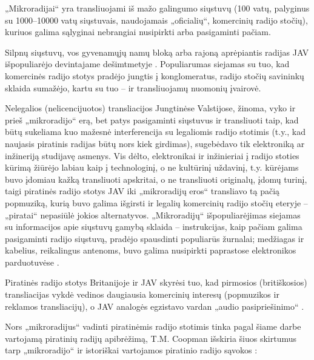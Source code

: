 \documentclass[kursinis-darbas]{vukf}
\begin{document}
„Mikroradijai“ yra transliuojami iš mažo galingumo siųstuvų (100 vatų, palyginus su 1000--10000 vatų siųstuvais, naudojamais „oficialių“, komercinių radijo stočių), kuriuos galima sąlyginai nebrangiai nusipirkti arba pasigaminti pačiam.

Silpnų siųstuvų, vos gyvenamųjų namų bloką arba rajoną aprėpiantis radijas JAV išpopuliarėjo devintajame dešimtmetyje \cite[p.~2]{tmc_fcc_enforcement_difficulties_with_unlicensed_micro_radio}. Populiarumas siejamas su tuo, kad komercinės radijo stotys pradėjo jungtis į konglomeratus, radijo stočių savininkų sklaida sumažėjo, kartu su tuo – ir transliuojamų nuomonių įvairovė.

Nelegalios (nelicencijuotos) transliacijos Jungtinėse Valstijose, žinoma, vyko ir prieš „mikroradijo“ erą, bet patys pasigaminti siųstuvus ir transliuoti taip, kad būtų sukeliama kuo mažesnė interferencija su legaliomis radijo stotimis (t.y., kad naujasis piratinis radijas būtų nors kiek girdimas), sugebėdavo tik elektroniką ar inžineriją studijavę asmenys. Vis dėlto, elektronikai ir inžinieriai į radijo stoties kūrimą žiūrėjo labiau kaip į technologinį, o ne kultūrinį uždavinį, t.y. kūrėjams buvo įdomiau kažką transliuoti apskritai, o ne transliuoti originalų, įdomų turinį, taigi piratinės radijo stotys JAV iki „mikroradijų eros“ transliavo tą pačią popmuziką, kurią buvo galima išgirsti ir legalių komercinių radijo stočių eteryje – „piratai“ nepasiūlė jokios alternatyvos. „Mikroradijų“ išpopuliarėjimas siejamas su informacijos apie siųstuvų gamybą sklaida – instrukcijas, kaip pačiam galima pasigaminti radijo siųstuvą, pradėjo spausdinti populiarūs žurnalai; medžiagas ir kabelius, reikalingus antenoms, buvo galima nusipirkti paprastose elektronikos parduotuvėse \cite[p.~37]{ay_low_power_fm_transmitters_electronics_now}.

Piratinės radijo stotys Britanijoje ir JAV skyrėsi tuo, kad pirmosios (britiškosios) transliacijas vykdė vedinos daugiausia komercinių interesų (popmuzikos ir reklamos transliacijų), o JAV analogės egzistavo vardan „audio pasipriešinimo“ \cite[p.~135]{hc_key_concepts_in_radio_studies}.

Nors „mikroradijus“ vadinti piratinėmis radijo stotimis tinka pagal šiame darbe vartojamą piratinių radijų apibrėžimą, T.M. Coopman išskiria šiuos skirtumus tarp „mikroradijo“ ir istoriškai vartojamos piratinio radijo sąvokos \cite[p.~3]{tmc_fcc_enforcement_difficulties_with_unlicensed_micro_radio}:
\end{document}
